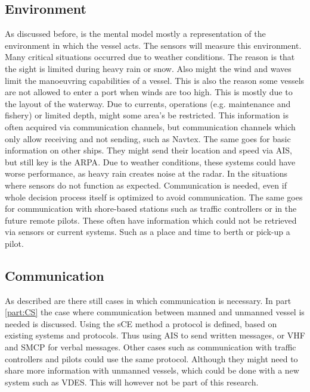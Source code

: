 \subsection{Environment}
As discussed before, is the mental model mostly a representation of the environment in which the vessel acts. The sensors will measure this environment. Many critical situations occurred due to weather conditions. The reason is that the sight is limited during heavy rain or snow. Also might the wind and waves limit the manoeuvring capabilities of a vessel. This is also the reason some vessels are not allowed to enter a port when winds are too high.
This is mostly due to the layout of the waterway. Due to currents, operations (e.g. maintenance and fishery) or limited depth, might some area's be restricted. This information is often acquired via communication channels, but communication channels which only allow receiving and not sending, such as \acf{Navtex}.
The same goes for basic information on other ships. They might send their location and speed via \ac{AIS}, but still key is the \ac{ARPA}. Due to weather conditions, these systems could have worse performance, as heavy rain creates noise at the radar. In the situations where sensors do not function as expected. Communication is needed, even if whole decision process itself is optimized to avoid communication.
The same goes for communication with shore-based stations such as traffic controllers or in the future remote pilots. These often have information which could not be retrieved via sensors or current systems. Such as a place and time to berth or pick-up a pilot.

\subsection{Communication}
As described are there still cases in which communication is necessary. In part \ref{part:CS} the case where communication between manned and unmanned vessel is needed is discussed. Using the \acf{sCE} method a protocol is defined, based on existing systems and protocols. Thus using \ac{AIS} to send written messages, or \ac{VHF} and \ac{SMCP} for verbal messages. 
Other cases such as communication with traffic controllers and pilots could use the same protocol. Although they might need to share more information with unmanned vessels, which could be done with a new system such as \ac{VDES}. This will however not be part of this research.

